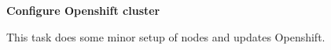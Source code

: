 \textbf{Configure Openshift cluster}

This task does some minor setup of nodes and updates Openshift.
